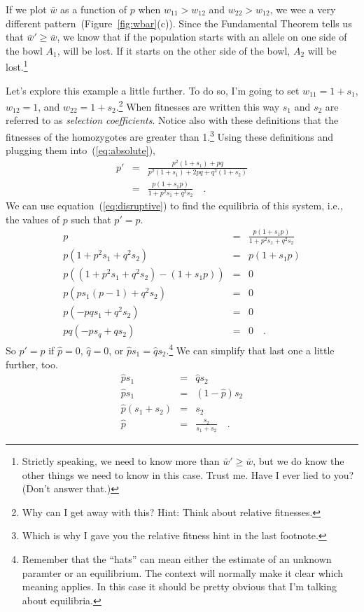 If we plot $\bar w$ as a function of $p$ when $w_{11} > w_{12}$ and
$w_{22} > w_{12}$, we wee a very different
pattern~(Figure~\ref{fig:wbar}(c)). Since the Fundamental Theorem
tells us that $\bar w' \ge \bar w$, we know that if the population
starts with an allele on one side of the bowl $A_1$, will be lost. If
it starts on the other side of the bowl, $A_2$ will be
lost.\footnote{Strictly speaking, we need to know more than $\bar w'
  \ge \bar w$, but we do know the other things we need to know in this
  case. Trust me. Have I ever lied to you? (Don't answer
  that.)}

Let's explore this example a little further. To do so, I'm going to
set $w_{11} = 1 + s_1$, $w_{12} = 1$, and $w_{22} = 1+
s_2$.\footnote{Why can I get away with this? Hint: Think about
  relative fitnesses.} When fitnesses are written this way $s_1$ and
$s_2$ are referred to as {\it selection coefficients}. Notice also
with these definitions that the fitnesses of the homozygotes are
greater than 1.\footnote{Which is why I gave you the relative fitness
  hint in the last footnote.} Using these definitions and plugging
them into~(\ref{eq:absolute}),
\begin{eqnarray}
p' &=& \frac{p^2(1+s_1) + pq}{p^2(1+s_1) + 2pq + q^2(1+s_2)} \nonumber
   \\
   &=& \frac{p(1 + s_1p)}{1 + p^2s_1 + q^2s_2} \quad . \label{eq:disruptive}
\end{eqnarray}
We can use equation~(\ref{eq:disruptive}) to find the equilibria of
this system, i.e., the values of $p$ such that $p' = p$.
\begin{eqnarray*}
p &=& \frac{p(1 + s_1p)}{1 + p^2s_1 + q^2s_2} \\
p(1 + p^2s_1 + q^2s_2) &=& p(1 + s_1p) \\
p\left((1 + p^2s_1 + q^2s_2) - (1 + s_1p)\right) &=& 0 \\
p\left(ps_1(p - 1) + q^2s_2\right) &=& 0 \\
p(-pqs_1 + q^2s_2) &=& 0 \\
pq(-ps_q + qs_2) &=& 0 \quad .
\end{eqnarray*}
So $p'=p$ if $\hat p=0$, $\hat q=0$, or $\hat ps_1 = \hat
qs_2$.\footnote{Remember that the ``hats'' can mean either the
  estimate of an unknown paramter or an equilibrium. The context will
  normally make it clear which meaning applies. In this case it should
  be pretty obvious that I'm talking about equilibria.} We can
simplify that last one a little further, too.
\begin{eqnarray*}
\hat ps_1 &=& \hat qs_2 \\
\hat ps_1 &=& (1-\hat p)s_2 \\
\hat p(s_1 + s_2) &=& s_2 \\
\hat p &=& \frac{s_2}{s_1+s_2} \quad .
\end{eqnarray*}

